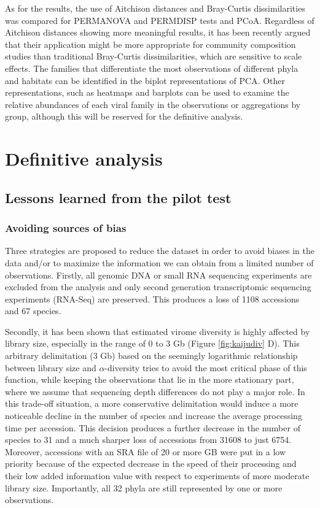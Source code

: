 \documentclass[
  openany]{book}
\begin{document}
As for the results, the use of Aitchison distances and Bray-Curtis dissimilarities was compared for PERMANOVA and PERMDISP tests and PCoA. Regardless of Aitchison distances showing more meaningful results, it has been recently argued that their application might be more appropriate for community composition studies than traditional Bray-Curtis dissimilarities, which are sensitive to scale effects. The families that differentiate the most observations of different phyla and habitats can be identified in the biplot representations of PCA. Other representations, such as heatmaps and barplots can be used to examine the relative abundances of each viral family in the observations or aggregations by group, although this will be reserved for the definitive analysis.

\hypertarget{definitive-analysis}{%
\chapter{Definitive analysis}\label{definitive-analysis}}

\hypertarget{lessons-learned-from-the-pilot-test}{%
\section{Lessons learned from the pilot test}\label{lessons-learned-from-the-pilot-test}}

\hypertarget{avoiding-sources-of-bias}{%
\subsection{Avoiding sources of bias}\label{avoiding-sources-of-bias}}

Three strategies are proposed to reduce the dataset in order to avoid biases in the data and/or to maximize the information we can obtain from a limited number of observations. Firstly, all genomic DNA or small RNA sequencing experiments are excluded from the analysis and only second generation transcriptomic sequencing experiments (RNA-Seq) are preserved. This produces a loss of 1108 accessions and 67 species.

Secondly, it has been shown that estimated virome diversity is highly affected by library size, especially in the range of 0 to 3 Gb (Figure \ref{fig:kaijudiv} D). This arbitrary delimitation (3 Gb) based on the seemingly logarithmic relationship between library size and \(\alpha\)-diversity tries to avoid the most critical phase of this function, while keeping the observations that lie in the more stationary part, where we assume that sequencing depth differences do not play a major role. In this trade-off situation, a more conservative delimitation would induce a more noticeable decline in the number of species and increase the average processing time per accession. This decision produces a further decrease in the number of species to 31 and a much sharper loss of accessions from 31608 to just 6754. Moreover, accessions with an SRA file of 20 or more GB were put in a low priority because of the expected decrease in the speed of their processing and their low added information value with respect to experiments of more moderate library size. Importantly, all 32 phyla are still represented by one or more observations.
\end{document}
